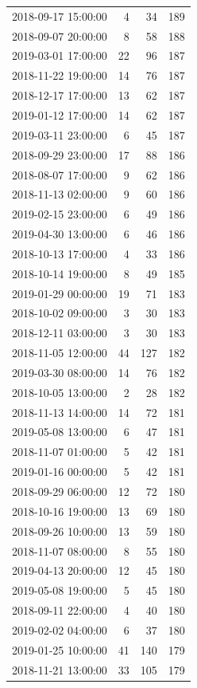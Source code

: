 \begin{tabular}{lrrr}
2018-09-17 15:00:00 & 4 & 34 & 189 \\
2018-09-07 20:00:00 & 8 & 58 & 188 \\
2019-03-01 17:00:00 & 22 & 96 & 187 \\
2018-11-22 19:00:00 & 14 & 76 & 187 \\
2018-12-17 17:00:00 & 13 & 62 & 187 \\
2019-01-12 17:00:00 & 14 & 62 & 187 \\
2019-03-11 23:00:00 & 6 & 45 & 187 \\
2018-09-29 23:00:00 & 17 & 88 & 186 \\
2018-08-07 17:00:00 & 9 & 62 & 186 \\
2018-11-13 02:00:00 & 9 & 60 & 186 \\
2019-02-15 23:00:00 & 6 & 49 & 186 \\
2019-04-30 13:00:00 & 6 & 46 & 186 \\
2018-10-13 17:00:00 & 4 & 33 & 186 \\
2018-10-14 19:00:00 & 8 & 49 & 185 \\
2019-01-29 00:00:00 & 19 & 71 & 183 \\
2018-10-02 09:00:00 & 3 & 30 & 183 \\
2018-12-11 03:00:00 & 3 & 30 & 183 \\
2018-11-05 12:00:00 & 44 & 127 & 182 \\
2019-03-30 08:00:00 & 14 & 76 & 182 \\
2018-10-05 13:00:00 & 2 & 28 & 182 \\
2018-11-13 14:00:00 & 14 & 72 & 181 \\
2019-05-08 13:00:00 & 6 & 47 & 181 \\
2018-11-07 01:00:00 & 5 & 42 & 181 \\
2019-01-16 00:00:00 & 5 & 42 & 181 \\
2018-09-29 06:00:00 & 12 & 72 & 180 \\
2018-10-16 19:00:00 & 13 & 69 & 180 \\
2018-09-26 10:00:00 & 13 & 59 & 180 \\
2018-11-07 08:00:00 & 8 & 55 & 180 \\
2019-04-13 20:00:00 & 12 & 45 & 180 \\
2019-05-08 19:00:00 & 5 & 45 & 180 \\
2018-09-11 22:00:00 & 4 & 40 & 180 \\
2019-02-02 04:00:00 & 6 & 37 & 180 \\
2019-01-25 10:00:00 & 41 & 140 & 179 \\
2018-11-21 13:00:00 & 33 & 105 & 179 \\

\end{tabular}
